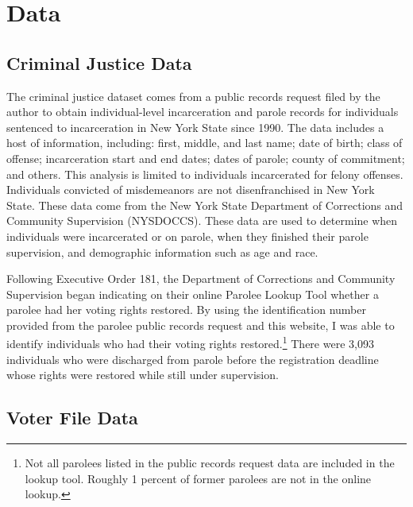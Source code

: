 \documentclass[
  12pt,
]{article}
\begin{document}
\hypertarget{data}{%
\section*{Data}\label{data}}

\hypertarget{criminal-justice-data}{%
\subsection*{Criminal Justice Data}\label{criminal-justice-data}}

The criminal justice dataset comes from a public records request filed by the author to obtain individual-level incarceration and parole records for individuals sentenced to incarceration in New York State since 1990. The data includes a host of information, including: first, middle, and last name; date of birth; class of offense; incarceration start and end dates; dates of parole; county of commitment; and others. This analysis is limited to individuals incarcerated for felony offenses. Individuals convicted of misdemeanors are not disenfranchised in New York State. These data come from the New York State Department of Corrections and Community Supervision (NYSDOCCS). These data are used to determine when individuals were incarcerated or on parole, when they finished their parole supervision, and demographic information such as age and race.

Following Executive Order 181, the Department of Corrections and Community Supervision began indicating on their online Parolee Lookup Tool whether a parolee had her voting rights restored. By using the identification number provided from the parolee public records request and this website, I was able to identify individuals who had their voting rights restored.\footnote{Not all parolees listed in the public records request data are included in the lookup tool. Roughly 1 percent of former parolees are not in the online lookup.} There were 3,093 individuals who were discharged from parole before the registration deadline whose rights were restored while still under supervision.

\hypertarget{voter-file-data}{%
\subsection*{Voter File Data}\label{voter-file-data}}
\end{document}
